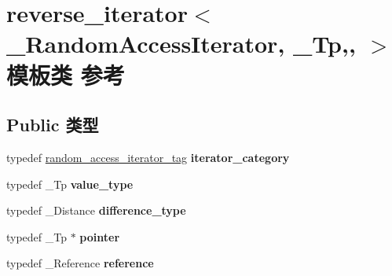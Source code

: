 \hypertarget{classreverse__iterator}{}\section{reverse\+\_\+iterator$<$ \+\_\+\+Random\+Access\+Iterator, \+\_\+\+Tp,, $>$ 模板类 参考}
\label{classreverse__iterator}
\subsection*{Public 类型}
\begin{DoxyCompactItemize}
\item 
\mbox{\label{classreverse__iterator_ac5c407b5ec0d845adab19072969b3906}} 
typedef \hyperlink{structrandom__access__iterator__tag}{random\+\_\+access\+\_\+iterator\+\_\+tag} {\bfseries iterator\+\_\+category}
\item 
\mbox{\label{classreverse__iterator_a3e587672ad48fbe991210a4ee96469e2}} 
typedef \+\_\+\+Tp {\bfseries value\+\_\+type}
\item 
\mbox{\label{classreverse__iterator_ae6c3ec49124d358fcfcf800e1d4d9b06}} 
typedef \+\_\+\+Distance {\bfseries difference\+\_\+type}
\item 
\mbox{\label{classreverse__iterator_ad7b9785e4deb2dd817bf0a708705b9e5}} 
typedef \+\_\+\+Tp $\ast$ {\bfseries pointer}
\item 
\mbox{\label{classreverse__iterator_af6edea9d854a9c54af0b40214c8c8064}} 
typedef \+\_\+\+Reference {\bfseries reference}
\end{DoxyCompactItemize}
